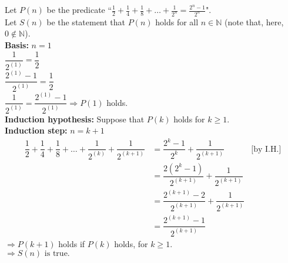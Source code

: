 \documentclass{article}
\begin{document}
Let $P(n)$ be the predicate ``$\tfrac{1}{2}+\tfrac{1}{4}+\tfrac{1}{8}+\ldots+\tfrac{1}{2^n}=\tfrac{2^n-1}{2^n}$".\\
Let $S(n)$ be the statement that $P(n)$ holds for all $n\in\mathbb{N}$ (note that, here, $0\notin\mathbb{N}$).\\[1ex]
\textbf{Basis:} $n=1$\\[1ex]
$\dfrac{1}{2^{(1)}}=\dfrac{1}{2}$\\[1ex]
$\dfrac{2^{(1)}-1}{2^{(1)}}=\dfrac{1}{2}$\\[1ex]
$\dfrac{1}{2^{(1)}}=\dfrac{2^{(1)}-1}{2^{(1)}}\Rightarrow P(1)$ holds.\\[1ex]
\textbf{Induction hypothesis:} Suppose that $P(k)$ holds for $k\geq 1$.\\[1ex]
\textbf{Induction step:} $n=k+1$
\begin{align*}
\dfrac{1}{2}+\dfrac{1}{4}+\dfrac{1}{8}+\ldots+\dfrac{1}{2^{(k)}}+\dfrac{1}{2^{(k+1)}}& =\dfrac{2^k-1}{2^k}+\dfrac{1}{2^{(k+1)}}& \text{[by I.H.]}\\
& =\dfrac{2(2^k-1)}{2^{(k+1)}}+\dfrac{1}{2^{(k+1)}}\\
& =\dfrac{2^{(k+1)}-2}{2^{(k+1)}}+\dfrac{1}{2^{(k+1)}}\\
& =\dfrac{2^{(k+1)}-1}{2^{(k+1)}}
\end{align*}
$\Rightarrow P(k+1)$ holds if $P(k)$ holds, for $k\geq 1$.\\[1ex]
$\boxed{\Rightarrow S(n)\text{ is true.}}$
\end{document}
